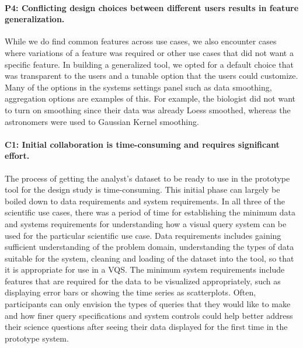 {\paragraph{P4: Conflicting design choices between different users results in feature generalization.}
While we do find common features across use cases, we also encounter cases where variations of a feature was required or other use cases that did not want a specific feature. In building a generalized tool, we opted for a default choice that was transparent to the users and a tunable option that the users could customize. Many of the options in the systems settings panel such as data smoothing, aggregation options are examples of this. For example, the biologist did not want to turn on smoothing since their data was already Loess smoothed, whereas the astronomers were used to Gaussian Kernel smoothing. 
\paragraph{C1: Initial collaboration is time-consuming and requires significant effort.} 
The process of getting the analyst's dataset to be ready to use in the prototype tool for the design study is time-consuming. This initial phase can largely be boiled down to data requirements and system requirements. In all three of the scientific use cases, there was a period of time for establishing the minimum data and systems requirements for understanding how a visual query system can be used for the particular scientific use case. Data requirements includes gaining sufficient understanding of the problem domain, understanding the types of data suitable for the system, cleaning and loading of the dataset into the tool, so that it is appropriate for use in a VQS. The minimum system requirements include features that are required for the data to be visualized appropriately, such as displaying error bars or showing the time series as scatterplots. Often, participants can only envision the types of queries that they would like to make and how finer query specifications and system controls could help better address their science questions after seeing their data displayed for the first time in the prototype system.
}
